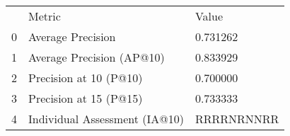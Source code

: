 \begin{tabular}{lll}
 & Metric & Value \\
0 & Average Precision & 0.731262 \\
1 & Average Precision (AP@10) & 0.833929 \\
2 & Precision at 10 (P@10) & 0.700000 \\
3 & Precision at 15 (P@15) & 0.733333 \\
4 & Individual Assessment (IA@10) & RRRRNRNNRR \\
\end{tabular}
